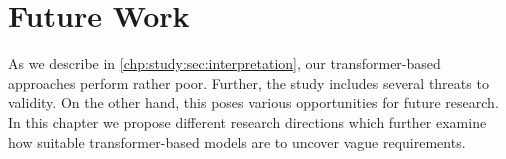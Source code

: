 \chapter{Future Work}
\label{chp:future_work}
As we describe in \cref{chp:study:sec:interpretation}, our transformer-based approaches perform rather poor.
Further, the study includes several threats to validity.
On the other hand, this poses various opportunities for future research.
In this chapter we propose different research directions which further examine how suitable transformer-based models are to uncover vague requirements.





